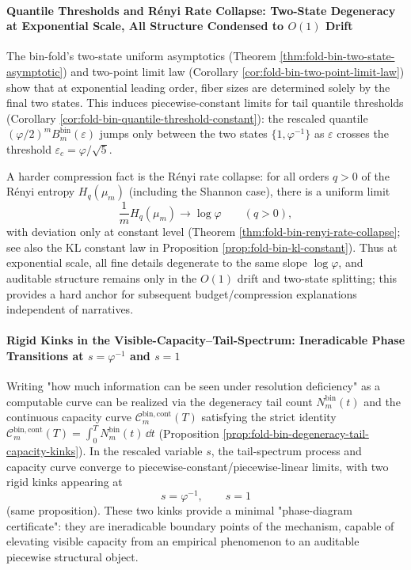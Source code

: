 \paragraph{Quantile Thresholds and R\'enyi Rate Collapse: Two-State Degeneracy at Exponential Scale, All Structure Condensed to \texorpdfstring{$O(1)$}{O(1)} Drift}
The bin-fold's two-state uniform asymptotics (Theorem \ref{thm:fold-bin-two-state-asymptotic}) and two-point limit law (Corollary \ref{cor:fold-bin-two-point-limit-law}) show that at exponential leading order, fiber sizes are determined solely by the final two states.
This induces piecewise-constant limits for tail quantile thresholds (Corollary \ref{cor:fold-bin-quantile-threshold-constant}): the rescaled quantile
\(
(\varphi/2)^m B^{\mathrm{bin}}_m(\varepsilon)
\)
jumps only between the two states \(\{1,\varphi^{-1}\}\) as \(\varepsilon\) crosses the threshold \(\varepsilon_c=\varphi/\sqrt5\).
\par
A harder compression fact is the R\'enyi rate collapse: for all orders \(q>0\) of the R\'enyi entropy \(H_q(\mu_m)\) (including the Shannon case), there is a uniform limit
\[
\frac{1}{m}H_q(\mu_m)\to\log\varphi
\qquad(q>0),
\]
with deviation only at constant level (Theorem \ref{thm:fold-bin-renyi-rate-collapse}; see also the KL constant law in Proposition \ref{prop:fold-bin-kl-constant}).
Thus at exponential scale, all fine details degenerate to the same slope \(\log\varphi\), and auditable structure remains only in the \(O(1)\) drift and two-state splitting; this provides a hard anchor for subsequent budget/compression explanations independent of narratives.

\paragraph{Rigid Kinks in the Visible-Capacity–Tail-Spectrum: Ineradicable Phase Transitions at \texorpdfstring{$s=\varphi^{-1}$}{s=phi^{-1}} and \texorpdfstring{$s=1$}{s=1}}
Writing "how much information can be seen under resolution deficiency" as a computable curve can be realized via the degeneracy tail count
\(
N^{\mathrm{bin}}_m(t)
\)
and the continuous capacity curve
\(
\mathcal{C}^{\mathrm{bin,cont}}_m(T)
\)
satisfying the strict identity
\(
\mathcal{C}^{\mathrm{bin,cont}}_m(T)=\int_0^T N^{\mathrm{bin}}_m(t)\,\dd t
\)
(Proposition \ref{prop:fold-bin-degeneracy-tail-capacity-kinks}).
In the rescaled variable \(s\), the tail-spectrum process and capacity curve converge to piecewise-constant/piecewise-linear limits, with two rigid kinks appearing at
\[
s=\varphi^{-1},\qquad s=1
\]
(same proposition).
These two kinks provide a minimal "phase-diagram certificate": they are ineradicable boundary points of the mechanism, capable of elevating visible capacity from an empirical phenomenon to an auditable piecewise structural object.

